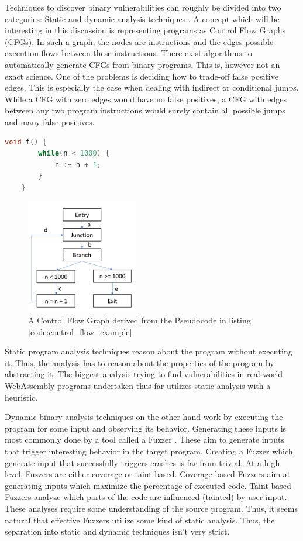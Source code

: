 \documentclass[sigconf]{acmart}
\begin{document}
Techniques to discover binary vulnerabilities can roughly be divided into two categories: Static and dynamic analysis techniques \cite{shoshitaishvili_sok_2016}. A concept which will be interesting in this discussion is representing programs as Control Flow Graphs (CFGs). In such a graph, the nodes are instructions and the edges possible execution flows between these instructions. There exist algorithms to automatically generate CFGs from binary programs. This is, however not an exact science. One of the problems is deciding how to trade-off false positive edges. This is especially the case when dealing with indirect or conditional jumps. While a CFG with zero edges would have no false positives, a CFG with edges between any two program instructions would surely contain all possible jumps and many false positives. 

\begin{lstlisting}[language=C++, label=code:control_flow_example, caption={This pseudocode corresponds to the control flow graph in Figure \ref{fig:vuln_example_redirect_control_flow}}]
	void f() {
		while(n < 1000) {
			n := n + 1;	
		}
	}
\end{lstlisting}

\begin{figure}[h]
  \centering
  \includegraphics[height=5cm]{control-flow-graph}
  \caption{A Control Flow Graph derived from the Pseudocode in listing \ref{code:control_flow_example}}  
\label{fig:vuln_example_redirect_control_flow}
\end{figure}

Static program analysis techniques reason about the program without executing it. Thus, the analysis has to reason about the properties of the program by abstracting it. The biggest analysis trying to find vulnerabilities in real-world WebAssembly programs undertaken thus far utilizes static analysis with a heuristic.

Dynamic binary analysis techniques on the other hand work by executing the program for some input and observing its behavior. Generating these inputs is most commonly done by a tool called a Fuzzer \cite{li_fuzzing_2018}. These aim to generate inputs that trigger interesting behavior in the target program. Creating a Fuzzer which generate input that successfully triggers crashes is far from trivial. At a high level, Fuzzers are either coverage or taint based. Coverage based Fuzzers aim at generating inputs which maximize the percentage of executed code. Taint based Fuzzers analyze which parts of the code are influenced (tainted) by user input. These analyses require some understanding of the source program. Thus, it seems natural that effective Fuzzers utilize some kind of static analysis. Thus, the separation into static and dynamic techniques isn't very strict.
\end{document}
